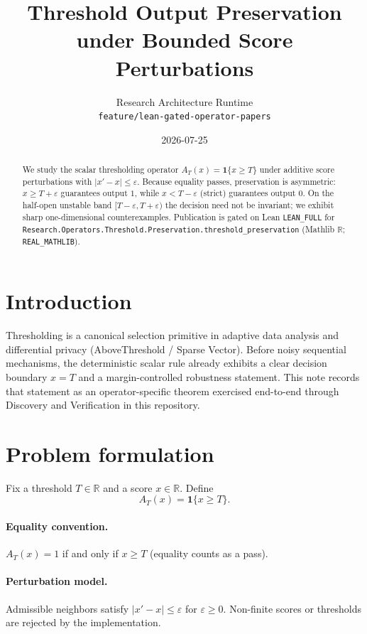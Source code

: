 \documentclass[11pt]{article}
\title{Threshold Output Preservation under Bounded Score Perturbations}
\author{Research Architecture Runtime \\ \texttt{feature/lean-gated-operator-papers}}
\date{2026-07-25}
\begin{document}
\maketitle

\begin{abstract}
We study the scalar thresholding operator
\(A_T(x)=\mathbf{1}\{x\ge T\}\) under additive score perturbations
with \(\lvert x'-x\rvert\le\varepsilon\).
Because equality passes, preservation is asymmetric:
\(x\ge T+\varepsilon\) guarantees output \(1\), while
\(x<T-\varepsilon\) (strict) guarantees output \(0\).
On the half-open unstable band \([T-\varepsilon,T+\varepsilon)\) the
decision need not be invariant; we exhibit sharp one-dimensional
counterexamples.
Publication is gated on Lean \texttt{LEAN\_FULL} for
\texttt{Research.Operators.Threshold.Preservation.threshold\_preservation}
(Mathlib $\mathbb{R}$; \texttt{REAL\_MATHLIB}).
\end{abstract}

\section{Introduction}
Thresholding is a canonical selection primitive in adaptive data analysis
and differential privacy (AboveThreshold / Sparse Vector).
Before noisy sequential mechanisms, the deterministic scalar rule already
exhibits a clear decision boundary \(x=T\) and a margin-controlled
robustness statement.
This note records that statement as an operator-specific theorem exercised
end-to-end through Discovery and Verification in this repository.

\section{Problem formulation}
Fix a threshold \(T\in\mathbb{R}\) and a score \(x\in\mathbb{R}\).
Define
\[
A_T(x)=\mathbf{1}\{x\ge T\}.
\]
\paragraph{Equality convention.}
\(A_T(x)=1\) if and only if \(x\ge T\) (equality counts as a pass).
\paragraph{Perturbation model.}
Admissible neighbors satisfy \(\lvert x'-x\rvert\le\varepsilon\) for
\(\varepsilon\ge 0\).
Non-finite scores or thresholds are rejected by the implementation.
\end{document}

